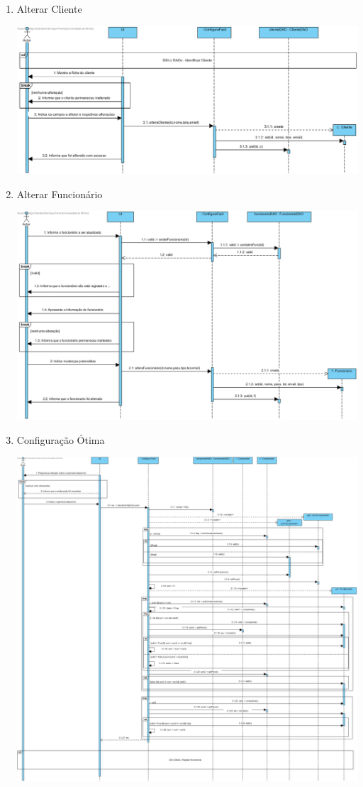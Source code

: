 \documentclass[11pt]{article} %
\begin{document}
\begin{enumerate}
\begin{center}
		\end{center}\newpage
	\item Alterar Cliente
		\begin{center}
 			\includegraphics[width = 6in]{dsi2_alterar_cliente.png}
		\end{center}
	\item Alterar Funcionário
		\begin{center}
 			\includegraphics[width = 6in]{dsi2_alterar_funcionario.png}
		\end{center}\newpage
	\item Configuração Ótima
		\begin{center}
 			\includegraphics[width = 6in]{dsi2_configuracao_otima.png}

\end{center}
\end{enumerate}
\end{document}
